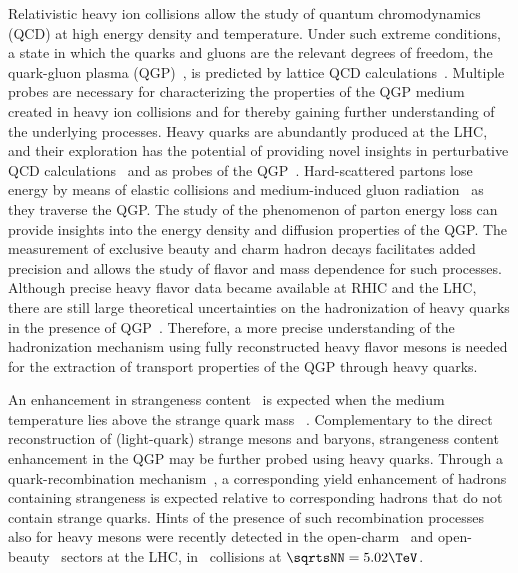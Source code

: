 Relativistic heavy ion collisions allow the study of quantum chromodynamics (QCD) at high energy density and temperature. Under such extreme conditions, a state in which the quarks and gluons are the relevant degrees of freedom, the quark-gluon plasma (QGP)~\cite{QGP1,QGP2}, is predicted by lattice QCD calculations~\cite{Karsch:2003jg}.
%
Multiple probes are necessary for characterizing the properties of the QGP medium created in heavy ion collisions and for thereby gaining further understanding of the underlying processes.
%
Heavy quarks are abundantly produced at the LHC, and their exploration has the potential of providing novel insights in perturbative QCD calculations~\cite{Andronic:2015wma} and as probes of the QGP~\cite{Dong:2019byy}.
%
Hard-scattered partons lose energy by means of elastic collisions and medium-induced gluon radiation~\cite{Eloss1,Baier:2000mf,Chatrchyan:2011sx,Aad:2010bu,Andronic:2015wma} as they traverse the QGP.
The study of the phenomenon of parton energy loss can provide insights into the energy density and diffusion properties of the QGP.
%
The measurement of exclusive beauty and charm hadron decays facilitates added precision and allows the study of flavor and mass dependence for such processes. 
%
Although precise heavy flavor data became available at RHIC and the LHC, there are still large theoretical uncertainties on the hadronization of heavy quarks in the presence of QGP~\cite{Rapp:2018qla}. Therefore, a more precise understanding of the hadronization mechanism using fully reconstructed heavy flavor mesons is needed for the extraction of transport properties of the QGP through heavy quarks. 

An enhancement in strangeness content~\cite{ALICE:2017jyt,Abelev:2013xaa,Agakishiev:2011ar,Abelev:2008zk,Arsene:2009jg,Adamczyk:2017wsl,Adare:2015ema} is expected when the medium temperature lies above the strange quark mass ~\cite{PhysRevLett.48.1066}. Complementary to the direct reconstruction of (light-quark) strange mesons and baryons, %
strangeness content enhancement in the QGP may be further probed using heavy quarks.
%
Through a quark-recombination mechanism~\cite{Molnar:2003ff,Greco:2003mm,Greco:2003vf,Andronic:2015wma,He:2014cla}, a corresponding yield enhancement of hadrons containing strangeness is expected relative to corresponding hadrons that do not contain strange quarks. 
%
Hints of the presence of such recombination processes also for heavy mesons were recently detected in the open-charm~\cite{Acharya:2018hre} and open-beauty~\cite{BsPbPbCMS} sectors at the LHC, in \PbPb\ collisions at $\sqrtsNN=5.02\TeV$. 


